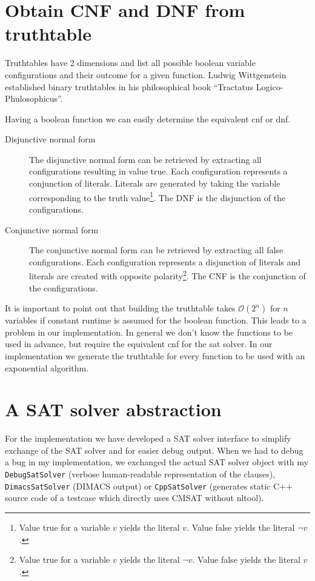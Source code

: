 \section{Obtain CNF and DNF from truthtable}
\label{sec:cnf-dnf}
%
Truthtables have 2 dimensions and list all possible boolean variable configurations and their outcome for a given function. Ludwig Wittgenstein established binary truthtables in his philosophical book ``Tractatus Logico-Phulosophicus''.

Having a boolean function we can easily determine the equivalent \gls{cnf} or \gls{dnf}.

\begin{description}
  \item[Disjunctive normal form]
    The disjunctive normal form can be retrieved by extracting all configurations resulting in value true. Each configuration represents a conjunction of literals. Literals are generated by taking the variable corresponding to the truth value\footnote{Value true for a variable $v$ yields the literal $v$. Value false yields the literal $\neg v$.}. The DNF is the disjunction of the configurations.
  \item[Conjunctive normal form]
    The conjunctive normal form can be retrieved by extracting all false configurations. Each configuration represents a disjunction of literals and literals are created with opposite polarity\footnote{Value true for a variable $v$ yields the literal $\neg v$. Value false yields the literal $v$.}. The CNF is the conjunction of the configurations.
\end{description}

It is important to point out that building the truthtable takes $\mathcal{O}(2^n)$ for $n$ variables if constant runtime is assumed for the boolean function. This leads to a problem in our implementation. In general we don't know the functions to be used in advance, but require the equivalent \gls{cnf} for the \gls{sat} solver. In our implementation we generate the truthtable for every function to be used with an exponential algorithm.


\section{A SAT solver abstraction}
\label{sec:satsolver-abstraction}
%
For the implementation we have developed a SAT solver interface to simplify exchange of the SAT solver and for easier debug output. When we had to debug a bug in my implementation, we exchanged the actual SAT solver object with my \texttt{DebugSatSolver} (verbose human-readable representation of the clauses), \texttt{DimacsSatSolver} (DIMACS output) or \texttt{CppSatSolver} (generates static C++ source code of a testcase which directly uses CMSAT without nltool).

